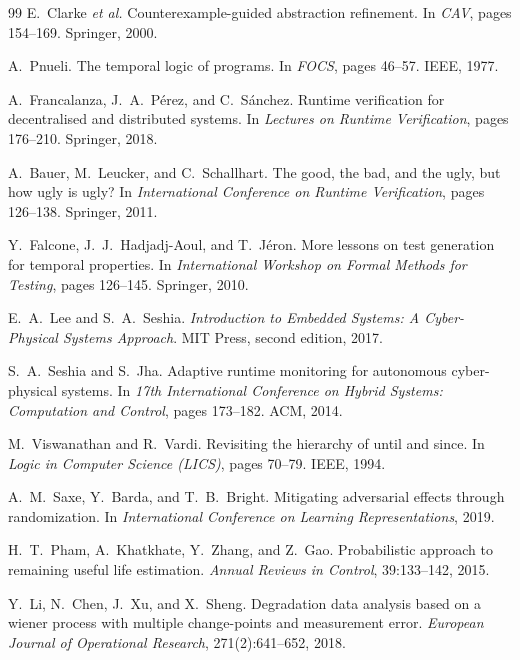 \documentclass{llncs}
\begin{document}
{\begin{thebibliography}{99}
E.~Clarke \textit{et al.}
Counterexample-guided abstraction refinement.
In \textit{CAV}, pages 154--169. Springer, 2000.

A.~Pnueli.
The temporal logic of programs.
In \textit{FOCS}, pages 46--57. IEEE, 1977.

A.~Francalanza, J.~A.~P{\'e}rez, and C.~S{\'a}nchez.
Runtime verification for decentralised and distributed systems.
In \textit{Lectures on Runtime Verification}, pages 176--210. Springer, 2018.

A.~Bauer, M.~Leucker, and C.~Schallhart.
The good, the bad, and the ugly, but how ugly is ugly?
In \textit{International Conference on Runtime Verification}, pages 126--138. Springer, 2011.

Y.~Falcone, J.~J.~Hadjadj-Aoul, and T.~Jéron.
More lessons on test generation for temporal properties.
In \textit{International Workshop on Formal Methods for Testing},
pages 126--145. Springer, 2010.

E.~A.~Lee and S.~A.~Seshia.
\textit{Introduction to Embedded Systems: A Cyber-Physical Systems Approach}.
MIT Press, second edition, 2017.

S.~A.~Seshia and S.~Jha.
Adaptive runtime monitoring for autonomous cyber-physical systems.
In \textit{17th International Conference on Hybrid Systems: Computation and
Control}, pages 173--182. ACM, 2014.

M.~Viswanathan and R.~Vardi.
Revisiting the hierarchy of until and since.
In \textit{Logic in Computer Science (LICS)}, pages 70--79. IEEE, 1994.

A.~M.~Saxe, Y.~Barda, and T.~B.~Bright.
Mitigating adversarial effects through randomization.
In \textit{International Conference on Learning Representations}, 2019.

H.~T.~Pham, A.~Khatkhate, Y.~Zhang, and Z.~Gao.
Probabilistic approach to remaining useful life estimation.
\textit{Annual Reviews in Control}, 39:133--142, 2015.

Y.~Li, N.~Chen, J.~Xu, and X.~Sheng.
Degradation data analysis based on a wiener process with
multiple change-points and measurement error.
\textit{European Journal of Operational Research}, 271(2):641--652, 2018.


\end{thebibliography}}
\end{document}
